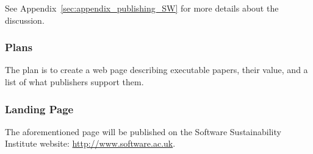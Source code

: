 See Appendix~\ref{sec:appendix_publishing_SW} for more details about the
discussion.

\subsubsection{Plans}

The plan is to create a web page describing executable papers, their value, and
a list of what publishers support them. 

\subsubsection{Landing Page}

The aforementioned page will be published on the Software Sustainability
Institute website: \url{http://www.software.ac.uk}.
